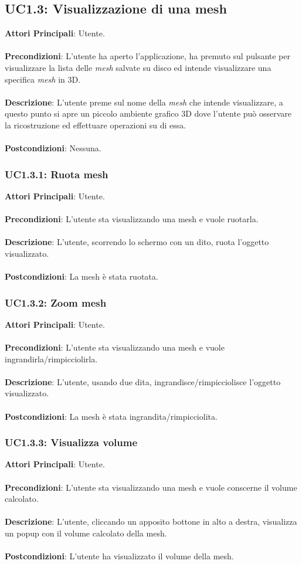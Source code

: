 \subsection{UC1.3: Visualizzazione di una mesh}
\textbf{Attori Principali}: Utente.
\\\\ \textbf{Precondizioni}: L'utente ha aperto l'applicazione, ha premuto sul pulsante per visualizzare la lista delle \emph{mesh} salvate su disco ed intende visualizzare una specifica \emph{mesh} in 3D.
\\\\ \textbf{Descrizione}: L'utente preme sul nome della \emph{mesh} che intende visualizzare, a questo punto si apre un piccolo ambiente grafico 3D dove l'utente può osservare la ricostruzione ed effettuare operazioni su di essa.
\\\\ \textbf{Postcondizioni}: Nessuna.

\subsubsection{UC1.3.1: Ruota mesh}
\textbf{Attori Principali}: Utente.
\\\\ \textbf{Precondizioni}: L'utente sta visualizzando una mesh e vuole ruotarla.
\\\\ \textbf{Descrizione}: L'utente, scorrendo lo schermo con un dito, ruota l'oggetto visualizzato.
\\\\ \textbf{Postcondizioni}: La mesh è stata ruotata.

\subsubsection{UC1.3.2: Zoom mesh}
\textbf{Attori Principali}: Utente.
\\\\ \textbf{Precondizioni}: L'utente sta visualizzando una mesh e vuole ingrandirla/rimpicciolirla.
\\\\ \textbf{Descrizione}: L'utente, usando due dita, ingrandisce/rimpicciolisce l'oggetto visualizzato.
\\\\ \textbf{Postcondizioni}: La mesh è stata ingrandita/rimpicciolita.

\subsubsection{UC1.3.3: Visualizza volume}
\textbf{Attori Principali}: Utente.
\\\\ \textbf{Precondizioni}: L'utente sta visualizzando una mesh e vuole conscerne il volume calcolato.
\\\\ \textbf{Descrizione}: L'utente, cliccando un apposito bottone in alto a destra, visualizza un popup con il volume calcolato della mesh.
\\\\ \textbf{Postcondizioni}: L'utente ha visualizzato il volume della mesh.

